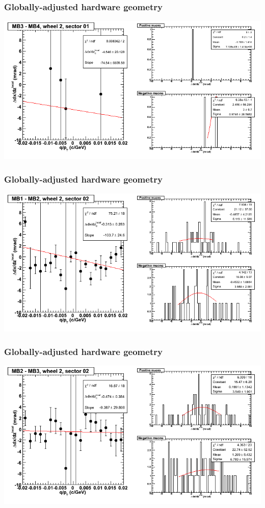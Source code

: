 \documentclass[compress]{beamer}
\begin{document}
\begin{frame}
\frametitle{Globally-adjusted hardware geometry}
\includegraphics[width=\linewidth]{NOV4_segdiffs_HW/dt13_slope_E_01_34.png}
\end{frame}

\begin{frame}
\frametitle{Globally-adjusted hardware geometry}
\includegraphics[width=\linewidth]{NOV4_segdiffs_HW/dt13_slope_E_02_12.png}
\end{frame}

\begin{frame}
\frametitle{Globally-adjusted hardware geometry}
\includegraphics[width=\linewidth]{NOV4_segdiffs_HW/dt13_slope_E_02_23.png}
\end{frame}
\end{document}
